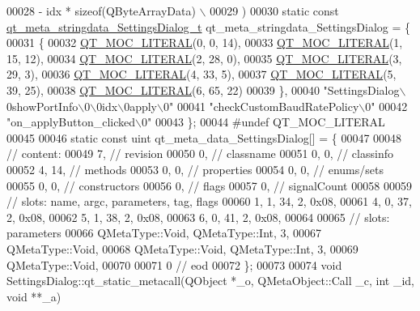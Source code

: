 \begin{DoxyCode}
00028 \textcolor{preprocessor}{        - idx * sizeof(QByteArrayData) \(\backslash\)}
00029 \textcolor{preprocessor}{    )}
00030 \textcolor{keyword}{static} \textcolor{keyword}{const} \hyperlink{a00018_d4/d98/a00120}{qt\_meta\_stringdata\_SettingsDialog\_t} 
      qt\_meta\_stringdata\_SettingsDialog = \{
00031     \{
00032 \hyperlink{a00018_a75bb9482d242cde0a06c9dbdc6b83abe}{QT\_MOC\_LITERAL}(0, 0, 14),
00033 \hyperlink{a00018_a75bb9482d242cde0a06c9dbdc6b83abe}{QT\_MOC\_LITERAL}(1, 15, 12),
00034 \hyperlink{a00018_a75bb9482d242cde0a06c9dbdc6b83abe}{QT\_MOC\_LITERAL}(2, 28, 0),
00035 \hyperlink{a00018_a75bb9482d242cde0a06c9dbdc6b83abe}{QT\_MOC\_LITERAL}(3, 29, 3),
00036 \hyperlink{a00018_a75bb9482d242cde0a06c9dbdc6b83abe}{QT\_MOC\_LITERAL}(4, 33, 5),
00037 \hyperlink{a00018_a75bb9482d242cde0a06c9dbdc6b83abe}{QT\_MOC\_LITERAL}(5, 39, 25),
00038 \hyperlink{a00018_a75bb9482d242cde0a06c9dbdc6b83abe}{QT\_MOC\_LITERAL}(6, 65, 22)
00039     \},
00040     \textcolor{stringliteral}{"SettingsDialog\(\backslash\)0showPortInfo\(\backslash\)0\(\backslash\)0idx\(\backslash\)0apply\(\backslash\)0"}
00041     \textcolor{stringliteral}{"checkCustomBaudRatePolicy\(\backslash\)0"}
00042     \textcolor{stringliteral}{"on\_applyButton\_clicked\(\backslash\)0"}
00043 \};
00044 \textcolor{preprocessor}{#undef QT\_MOC\_LITERAL}
00045 
00046 \textcolor{keyword}{static} \textcolor{keyword}{const} uint qt\_meta\_data\_SettingsDialog[] = \{
00047 
00048  \textcolor{comment}{// content:}
00049        7,       \textcolor{comment}{// revision}
00050        0,       \textcolor{comment}{// classname}
00051        0,    0, \textcolor{comment}{// classinfo}
00052        4,   14, \textcolor{comment}{// methods}
00053        0,    0, \textcolor{comment}{// properties}
00054        0,    0, \textcolor{comment}{// enums/sets}
00055        0,    0, \textcolor{comment}{// constructors}
00056        0,       \textcolor{comment}{// flags}
00057        0,       \textcolor{comment}{// signalCount}
00058 
00059  \textcolor{comment}{// slots: name, argc, parameters, tag, flags}
00060        1,    1,   34,    2, 0x08,
00061        4,    0,   37,    2, 0x08,
00062        5,    1,   38,    2, 0x08,
00063        6,    0,   41,    2, 0x08,
00064 
00065  \textcolor{comment}{// slots: parameters}
00066     QMetaType::Void, QMetaType::Int,    3,
00067     QMetaType::Void,
00068     QMetaType::Void, QMetaType::Int,    3,
00069     QMetaType::Void,
00070 
00071        0        \textcolor{comment}{// eod}
00072 \};
00073 
00074 \textcolor{keywordtype}{void} SettingsDialog::qt\_static\_metacall(QObject *\_o, QMetaObject::Call \_c, \textcolor{keywordtype}{int} \_id, \textcolor{keywordtype}{void} **\_a)

\end{DoxyCode}
